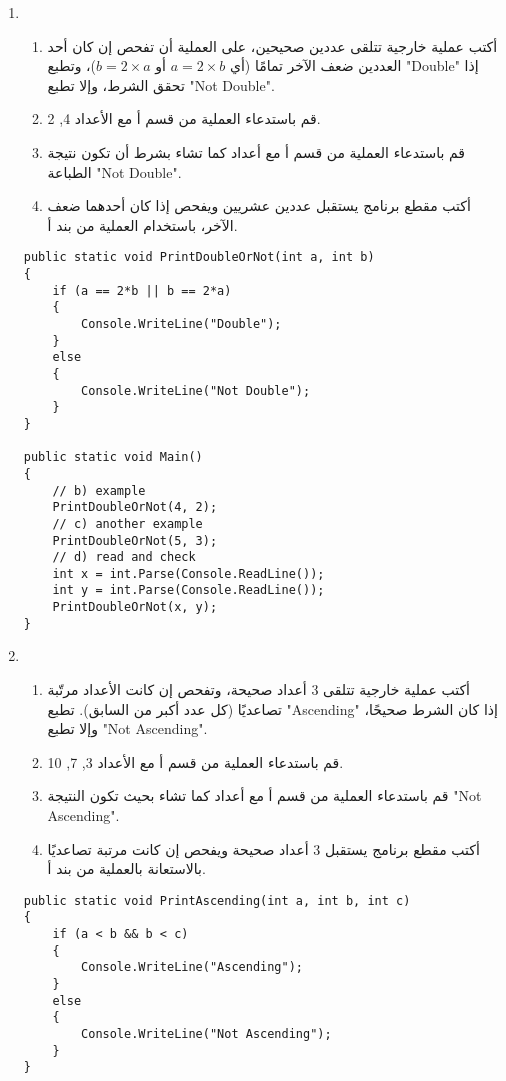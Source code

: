 ﻿\documentclass[12pt]{article}
\begin{document}
\begin{enumerate}[itemsep=3em]
\begin{enumerate}
\clearpage
\item
\begin{enumerate}
\item أكتب عملية خارجية تتلقى عددين صحيحين، على العملية أن تفحص إن كان أحد العددين ضعف الآخر تمامًا (أي $a = 2 \times b$ أو $b = 2 \times a$)، وتطبع \textenglish{"Double"} إذا تحقق الشرط، وإلا تطبع \textenglish{"Not Double"}.
\item قم باستدعاء العملية من قسم أ مع الأعداد \textenglish{4, 2}.
\item قم باستدعاء العملية من قسم أ مع أعداد كما تشاء بشرط أن تكون نتيجة الطباعة \textenglish{"Not Double"}.
\item أكتب مقطع برنامج يستقبل عددين عشريين ويفحص إذا كان أحدهما ضعف الآخر، باستخدام العملية من بند أ.
\end{enumerate}
\ifwithsols
\begin{boxSolution}
\begin{english}
\begin{verbatim}
public static void PrintDoubleOrNot(int a, int b)
{
    if (a == 2*b || b == 2*a)
    {
        Console.WriteLine("Double");
    }
    else
    {
        Console.WriteLine("Not Double");
    }
}

public static void Main()
{
    // b) example
    PrintDoubleOrNot(4, 2);
    // c) another example
    PrintDoubleOrNot(5, 3);
    // d) read and check
    int x = int.Parse(Console.ReadLine());
    int y = int.Parse(Console.ReadLine());
    PrintDoubleOrNot(x, y);
}
\end{verbatim}
\end{english}
\end{boxSolution}
\clearpage
\fi

\item
\begin{enumerate}
    \item أكتب عملية خارجية تتلقى 3 أعداد صحيحة، وتفحص إن كانت الأعداد مرتّبة تصاعديًا (كل عدد أكبر من السابق).
    تطبع \textenglish{"Ascending"} إذا كان الشرط صحيحًا، وإلا تطبع \textenglish{"Not Ascending"}.
    \item قم باستدعاء العملية من قسم أ مع الأعداد \textenglish{3, 7, 10}.
    \item قم باستدعاء العملية من قسم أ مع أعداد كما تشاء بحيث تكون النتيجة \textenglish{"Not Ascending"}.
    \item أكتب مقطع برنامج يستقبل 3 أعداد صحيحة ويفحص إن كانت مرتبة تصاعديًا بالاستعانة بالعملية من بند أ.
\end{enumerate}
\ifwithsols
\begin{boxSolution}
\begin{english}
\begin{verbatim}
public static void PrintAscending(int a, int b, int c)
{
    if (a < b && b < c)
    {
        Console.WriteLine("Ascending");
    }
    else
    {
        Console.WriteLine("Not Ascending");
    }
}


\end{verbatim}
\end{english}
\end{boxSolution}
\end{enumerate}
\end{enumerate}
\end{document}
